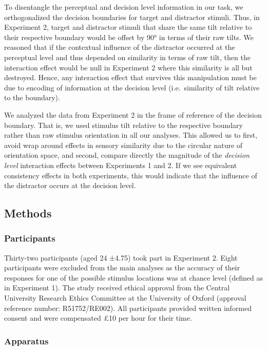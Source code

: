 \documentclass[a4paper, nobind]{templates/ociamthesis}
\begin{document}
To disentangle the perceptual and decision level information in our task, we orthogonalized the decision boundaries for target and distractor stimuli. Thus, in Experiment 2, target and distractor stimuli that share the same tilt relative to their respective boundary would be offset by 90° in terms of their raw tilts. We reasoned that if the contextual influence of the distractor occurred at the perceptual level and thus depended on similarity in terms of raw tilt, then the interaction effect would be null in Experiment 2 where this similarity is all but destroyed. Hence, any interaction effect that survives this manipulation must be due to encoding of information at the decision level (i.e.~similarity of tilt relative to the boundary).

We analyzed the data from Experiment 2 in the frame of reference of the decision boundary. That is, we used stimulus tilt relative to the respective boundary rather than raw stimulus orientation in all our analyses. This allowed us to first, avoid wrap around effects in sensory similarity due to the circular nature of orientation space, and second, compare directly the magnitude of the \emph{decision level} interaction effects between Experiments 1 and 2. If we see equivalent consistency effects in both experiments, this would indicate that the influence of the distractor occurs at the decision level.

\hypertarget{methods-4}{%
\subsection{Methods}\label{methods-4}}

\hypertarget{participants-2}{%
\subsubsection{Participants}\label{participants-2}}

Thirty-two participants (aged 24 ±4.75) took part in Experiment 2. Eight participants were excluded from the main analyses as the accuracy of their responses for one of the possible stimulus locations was at chance level (defined as in Experiment 1). The study received ethical approval from the Central University Research Ethics Committee at the University of Oxford (approval reference number: R51752/RE002). All participants provided written informed consent and were compensated £10 per hour for their time.

\hypertarget{apparatus-1}{%
\subsubsection{Apparatus}\label{apparatus-1}}
\end{document}
